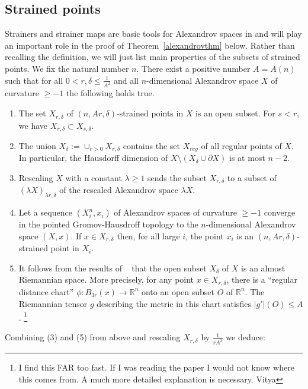 \documentclass[12pt,leqno,intlimits]{amsart}
\numberwithin{equation}{section}
\theoremstyle{definition}
\theoremstyle{remark}
\newcommand{\tref}[1]{Theorem~\ref{#1}}
\newcommand{\R}{\mathbb{R}}
\begin{document}
\subsection{Strained points}    Strainers and strainer maps are basic tools for Alexandrov spaces in \cite{BGP} and will play an important role in the proof of \tref{alexandrovthm} below. Rather than recalling the definition, we will just list main properties of the subsets of strained points.  We fix the natural number $n$.
There exist a positive number $A=A(n)$ such that for   all $0<r,\delta \leq  \frac 1 {A^2}$ and all $n$-dimensional Alexandrov space $X$ of curvature $\geq -1$ the following holds true.
\begin{enumerate}
\item The set $X_{r,\delta}$ of $(n,Ar, \delta)$-strained points in $X$ is an open subset.  For $s<r$, we have $X_{r,\delta} \subset X_{s,\delta}$.
\item The union $X_{\delta}:= \cup _{r>0}  X_{r,\delta}$ contains the set $X_{reg}$ of all regular points of $X$. In particular, the Hausdorff dimension of $X\setminus (X_{\delta} \cup \partial X)$ is at most $n-2$.
\item Rescaling $X$ with a constant $\lambda \geq 1$ sends the subset $X_{r,\delta}$ to a subset of $(\lambda X )_{\lambda r, \delta} $ of the rescaled Alexandrov space $\lambda X$.
\item Let a sequence    $(X_i ^n,x_i)$ of Alexandrov spaces  of curvature $\geq -1$ converge in the pointed Gromov-Hausdroff topology to the $n$-dimensional Alexandrov space $(X,x)$.
If $x\in X_{r,\delta}$ then, for all large $i$, the point $x_i$ is an   $(n,Ar, \delta)$-strained point in $X_i$.
\item It follows from the results of ~\cite{Per-DC} that the open subset $X_{\delta}$ of $X$ is an almost Riemannian space.
 More precisely, for any point $x\in X_{r,\delta}$, there is a ``regular distance chart'' $\phi:B_{3r} (x)\to \R^n$ onto an open subset $O$ of $\R^n$. The Riemannian tensor $g$   describing the
metric in this chart  satisfies $|g'| (O) \leq A$. \footnote{\color{red} I find this FAR too fast. If I was reading the paper I would not know where this comes from. A much more detailed explanation is necessary.  Vitya}

\end{enumerate}


Combining (3) and (5) from above and rescaling $X_{r,\delta}$  by $\frac 1 {r A^2} $  we
 deduce:
\end{document}
